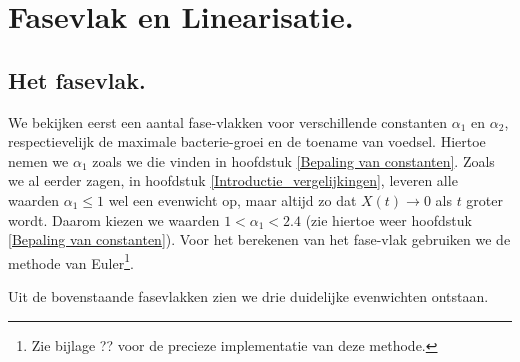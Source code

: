 
\chapter{Fasevlak en Linearisatie.}

\section{Het fasevlak.}

We bekijken eerst een aantal fase-vlakken voor verschillende constanten $\alpha_1$ en $\alpha_2$, respectievelijk de maximale bacterie-groei en de toename van voedsel. Hiertoe nemen we $\alpha_1$ zoals we die vinden in hoofdstuk \ref{Bepaling van constanten}. Zoals we al eerder zagen, in hoofdstuk \ref{Introductie_vergelijkingen}, leveren alle waarden $ \alpha_1 \leq 1$ wel een evenwicht op, maar altijd zo dat $X(t) \to 0$ als $t$ groter wordt. Daarom kiezen we waarden $1 < \alpha_1  < 2.4$ (zie hiertoe weer hoofdstuk \ref{Bepaling van constanten}). Voor het berekenen van het fase-vlak gebruiken we de methode van Euler\footnote{Zie bijlage ?? voor de precieze implementatie van deze methode.}.




Uit de bovenstaande fasevlakken zien we drie duidelijke evenwichten ontstaan. 
